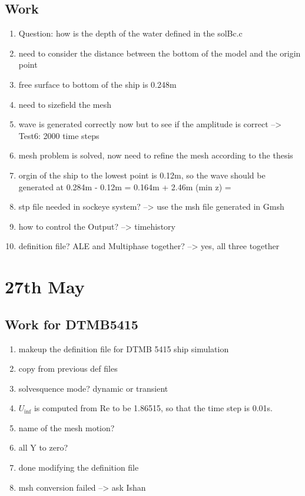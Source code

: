 \documentclass[12pt]{article} %
\begin{document}
\subsection{Work}
\begin{enumerate}
    \item Question: how is the depth of the water defined in the solBc.c
    \item need to consider the distance between the bottom of the model and the origin point 
    \item free surface to bottom of the ship is 0.248m
    \item need to sizefield the mesh
    \item wave is generated correctly now but to see if the amplitude is correct --> Test6: 2000 time steps 
    \item mesh problem is solved, now need to refine the mesh according to the thesis
    \item orgin of the ship to the lowest point is 0.12m, so the wave should be generated at 0.284m - 0.12m = 0.164m + 2.46m (min z) = 
    \item stp file needed in sockeye system? --> use the msh file generated in Gmsh
    \item how to control the Output? --> timehistory
    \item definition file? ALE and Multiphase together? --> yes, all three together
\end{enumerate}

\section{27th May}
\subsection{Work for DTMB5415}
\begin{enumerate}
    \item makeup the definition file for DTMB 5415 ship simulation
    \item copy from previous def files
    \item solvesquence mode? dynamic or transient
    \item $U_{\inf}$ is computed from Re to be 1.86515, so that the time step is 0.01s.
    \item name of the mesh motion?
    \item all Y to zero?
    \item done modifying the definition file
    \item msh conversion failed --> ask Ishan
\end{enumerate}
\end{document}

